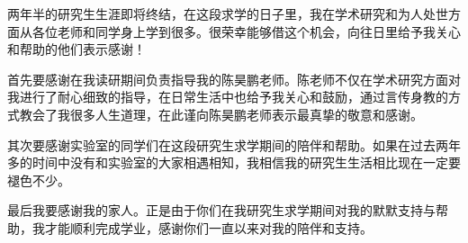 \begin{thanks}
两年半的研究生生涯即将终结，在这段求学的日子里，我在学术研究和为人处世方面从各位老师和同学身上学到很多。很荣幸能够借这个机会，向往日里给予我关心和帮助的他们表示感谢！

首先要感谢在我读研期间负责指导我的陈昊鹏老师。陈老师不仅在学术研究方面对我进行了耐心细致的指导，在日常生活中也给予我关心和鼓励，通过言传身教的方式教会了我很多人生道理，在此谨向陈昊鹏老师表示最真挚的敬意和感谢。

其次要感谢实验室的同学们在这段研究生求学期间的陪伴和帮助。如果在过去两年多的时间中没有和实验室的大家相遇相知，我相信我的研究生生活相比现在一定要褪色不少。

最后我要感谢我的家人。正是由于你们在我研究生求学期间对我的默默支持与帮助，我才能顺利完成学业，感谢你们一直以来对我的陪伴和支持。
\end{thanks}
